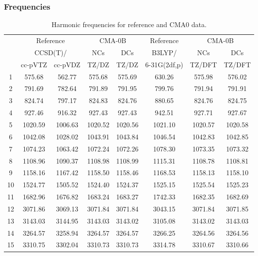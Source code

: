 \documentclass[10pt,oneside]{article}
\begin{document}
\clearpage

\subsubsection*{Frequencies}
\begin{table}[h!]
\centering
\caption{Harmonic frequencies for reference and CMA0 data.}
\begin{tabular}{cccccccc}
\toprule
{} & \multicolumn{2}{c}{Reference} & \multicolumn{2}{c}{CMA-0B} &    Reference & \multicolumn{2}{c}{CMA-0B} \\
{} & \multicolumn{2}{c}{CCSD(T)/} &     NCs &     DCs &       B3LYP/ &     NCs &     DCs \\
{} &   cc-pVTZ & cc-pVDZ &   TZ/DZ &   TZ/DZ & 6-31G(2df,p) &  TZ/DFT &  TZ/DFT \\
\midrule
1  &    575.68 &  562.77 &  575.68 &  575.69 &       630.26 &  575.98 &  576.02 \\
2  &    791.69 &  782.64 &  791.89 &  791.95 &       799.76 &  791.94 &  791.91 \\
3  &    824.74 &  797.17 &  824.83 &  824.76 &       880.65 &  824.76 &  824.75 \\
4  &    927.46 &  916.32 &  927.43 &  927.43 &       942.51 &  927.71 &  927.67 \\
5  &   1020.59 & 1006.63 & 1020.52 & 1020.56 &      1021.10 & 1020.57 & 1020.58 \\
6  &   1042.08 & 1028.02 & 1043.91 & 1043.84 &      1046.54 & 1042.83 & 1042.85 \\
7  &   1074.23 & 1063.42 & 1072.24 & 1072.26 &      1078.30 & 1073.35 & 1073.32 \\
8  &   1108.96 & 1090.37 & 1108.98 & 1108.99 &      1115.31 & 1108.78 & 1108.81 \\
9  &   1158.16 & 1167.42 & 1158.50 & 1158.46 &      1168.53 & 1158.13 & 1158.10 \\
10 &   1524.77 & 1505.52 & 1524.40 & 1524.37 &      1525.15 & 1525.54 & 1525.23 \\
11 &   1682.96 & 1676.82 & 1683.24 & 1683.27 &      1742.33 & 1682.35 & 1682.69 \\
12 &   3071.86 & 3069.13 & 3071.84 & 3071.84 &      3043.15 & 3071.84 & 3071.85 \\
13 &   3143.03 & 3144.95 & 3143.03 & 3143.02 &      3105.08 & 3143.02 & 3143.03 \\
14 &   3264.57 & 3258.94 & 3264.57 & 3264.57 &      3266.25 & 3264.56 & 3264.56 \\
15 &   3310.75 & 3302.04 & 3310.73 & 3310.73 &      3314.78 & 3310.67 & 3310.66 \\
\bottomrule
\end{tabular}
\end{table}
\end{document}
